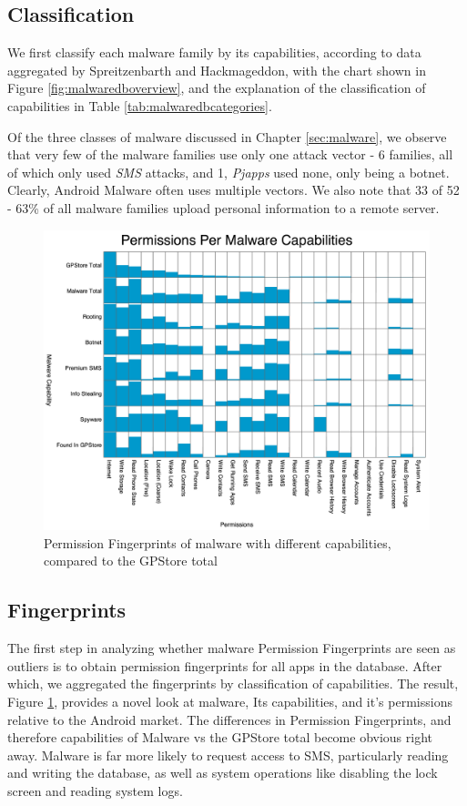 \subsection{Classification}
We first classify each malware family by its capabilities, according to data aggregated by Spreitzenbarth\citep{spreitzenbarth2013} and Hackmageddon\citep{hackmageddon2011}, with the chart shown in Figure \ref{fig:malwaredboverview}, and the explanation of the classification of capabilities in Table \ref{tab:malwaredbcategories}.

Of the three classes of malware discussed in Chapter \ref{sec:malware}, we observe that very few of the malware families use only one attack vector - 6 families, all of which only used \textit{SMS} attacks, and 1, \textit{Pjapps} used none, only being a botnet. Clearly, Android Malware often uses multiple vectors. We also note that 33 of 52 - 63\% of all malware families upload personal information to a remote server. 

\begin{figure}[h]
\begin{center}
\includegraphics[width=1.0\columnwidth]{figs/MalwareCapabiltiesPermissions}
\caption{Permission Fingerprints of malware with different capabilities, compared to the GPStore total}
\label{fig:malwarefingerprint}
\end{center}
\end{figure}

\subsection{Fingerprints}
The first step in analyzing whether malware Permission Fingerprints are seen as outliers is to obtain permission fingerprints for all apps in the database. After which, we aggregated the fingerprints by classification of capabilities. The result, Figure \ref{fig:malwarefingerprint}, provides a novel look at malware, Its capabilities, and it's permissions relative to the Android market. The differences in Permission Fingerprints, and therefore capabilities of Malware vs the GPStore total become obvious right away. Malware is far more likely to request access to SMS, particularly reading and writing the database, as well as system operations like disabling the lock screen and reading system logs. 

